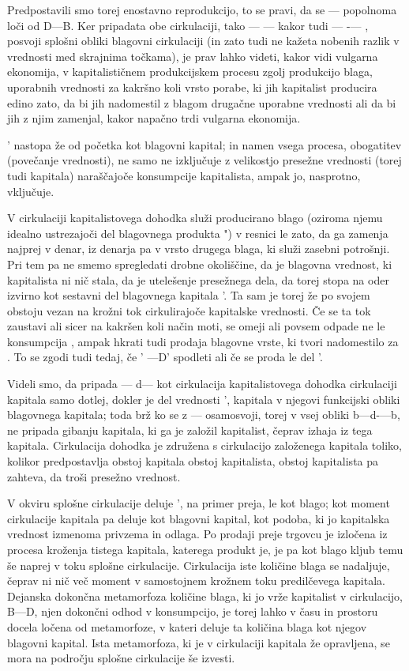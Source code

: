 \documentclass[kapital_02.tex]{subfiles}
\begin{document}
Predpostavili smo torej enostavno reprodukcijo, to se pravi, da se \KPEd — \KPEb popolnoma loči od D—B. Ker pripadata obe cirkulaciji, tako \KPEb — \KPEd — \KPEb kakor tudi \KPEB — \KPED-— \KPEB, posvoji splošni obliki blagovni cirkulaciji (in zato tudi ne kažeta nobenih razlik v vrednosti med skrajnima točkama), je prav lahko videti, kakor vidi vulgarna ekonomija, v kapitalističnem produkcijskem procesu zgolj produkcijo blaga, uporabnih vrednosti za kakršno koli vrsto porabe, ki jih kapitalist producira edino zato, da bi jih nadomestil z blagom drugačne uporabne vrednosti ali da bi jih z njim zamenjal, kakor napačno trdi vulgarna ekonomija.

\KPEB' nastopa že od početka kot blagovni kapital; in namen vsega procesa, obogatitev (povečanje vrednosti), ne samo ne izključuje z velikostjo presežne vrednosti (torej tudi kapitala) naraščajoče konsumpcije kapitalista, ampak jo, nasprotno, vključuje.

V cirkulaciji kapitalistovega dohodka služi producirano blago \KPEb (oziroma njemu idealno ustrezajoči del blagovnega produkta \KPEB") v resnici le zato, da ga zamenja najprej v denar, iz denarja pa v vrsto drugega blaga, ki služi zasebni potrošnji. Pri tem pa ne smemo spregledati drobne okoliščine, da je \KPEb blagovna vrednost, ki kapitalista ni nič stala, da je utelešenje presežnega dela, da torej stopa na oder izvirno kot sestavni del blagovnega kapitala \KPEB'. Ta \KPEb sam je torej že po svojem obstoju vezan na krožni tok cirkulirajoče kapitalske vrednosti. Če se ta tok zaustavi ali sicer na kakršen koli način moti, se omeji ali povsem odpade ne le konsumpcija \KPEb, ampak hkrati tudi prodaja blagovne vrste, ki tvori nadomestilo za \KPEb. To se zgodi tudi tedaj, če \KPEB' —D' spodleti ali če se proda le del \KPEB'.

Videli smo, da pripada \KPEb — d— \KPEb kot cirkulacija kapitalistovega dohodka cirkulaciji kapitala samo dotlej, dokler je \KPEb del vrednosti \KPEB', kapitala v njegovi funkcijski obliki blagovnega kapitala; toda brž ko se z \KPEd — \KPEb osamosvoji, torej v vsej obliki b—d-—b, ne pripada gibanju kapitala, ki ga je založil kapitalist, čeprav izhaja iz tega kapitala. Cirkulacija dohodka je združena s cirkulacijo založenega kapitala toliko, kolikor predpostavlja obstoj kapitala obstoj kapitalista, obstoj kapitalista pa zahteva, da troši presežno vrednost.

V okviru splošne cirkulacije deluje \KPEB', na primer preja, le kot blago; kot moment cirkulacije kapitala pa deluje kot blagovni kapital, kot podoba, ki jo kapitalska vrednost izmenoma privzema in odlaga. Po prodaji preje trgovcu je izločena iz procesa kroženja tistega kapitala, katerega produkt je, je pa kot blago kljub temu še naprej v toku splošne cirkulacije. Cirkulacija iste količine blaga se nadaljuje, čeprav ni nič več moment v samostojnem krožnem toku predilčevega kapitala. Dejanska dokončna metamorfoza količine blaga, ki jo vrže kapitalist v cirkulacijo, B—D, njen dokončni odhod v konsumpcijo, je torej lahko v času in prostoru docela ločena od metamorfoze, v kateri deluje ta količina blaga kot njegov blagovni kapital. Ista metamorfoza, ki je v cirkulaciji kapitala že opravljena, se mora na področju splošne cirkulacije še izvesti.
\end{document}
